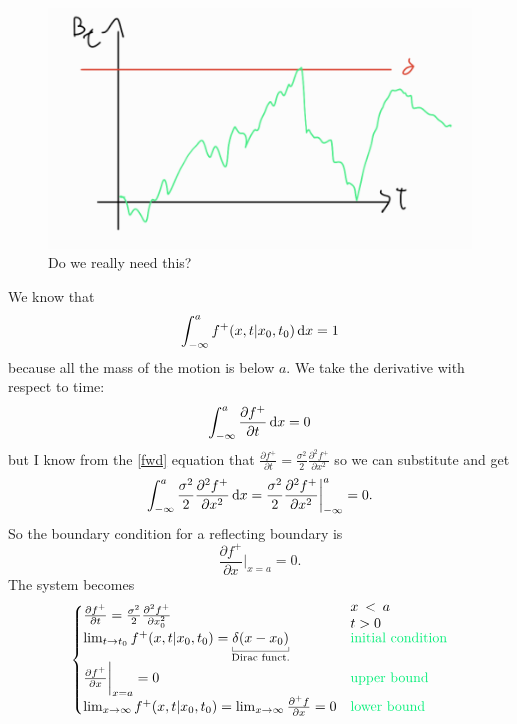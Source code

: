 \documentclass[12pt]{report}
\begin{document}
\begin{enumerate}
	\begin{figure}[H]
		\centering
		\includegraphics[width=0.5\linewidth]{img/screenshot052}
		\caption{Do we really need this?}
		\label{fig:screenshot052}
	\end{figure}
	We know that
	\begin{equation*}
		\int_{-\infty}^{a}f^{+}(x,t|x_{0},t_{0})\mathop{}\!\mathrm{d} x=1
	\end{equation*}
	because all the mass of the motion is below $a$. We take the derivative with respect to time:
	\begin{equation*}
		\int_{-\infty}^{a}\frac{\partial f^{+}}{\partial t}\mathop{}\!\mathrm{d} x=0
	\end{equation*}
	but I know from the \ref{fwd} equation that $\frac{\partial f^{+}}{\partial t}=\frac{\sigma^{2}}{2}\frac{\partial^{2}f^{+}}{\partial x^{2}}$ so we can substitute and get
	\begin{equation*}
		\int_{-\infty}^{a}\frac{\sigma^{2}}{2}\frac{\partial^{2}f^{+}}{\partial x^{2}}\mathop{}\!\mathrm{d} x=\frac{\sigma^{2}}{2}\frac{\partial^{2}f^{+}}{\partial x^{2}}\bigg|_{-\infty}^{a}=0.
	\end{equation*}
	So the boundary condition for a reflecting boundary is
	\begin{equation*}
		\frac{\partial f^{+}}{\partial x}\bigg|_{x=a}=0.
	\end{equation*}
	The system becomes
		\begin{equation*}\begin{cases}
			\frac{\partial f^+}{\partial t}=\frac{\sigma^{2}}{2}\frac{\partial^{2}f^+}{\partial x_{0}^{2}}&\parbox{1cm}{$x<a$ $t>0$}\\
			\lim_{t\to t_0}f^{+}(x,t|x_{0},t_{0})=\ubracketthin{\delta(x-x_{0})}_{\claptext{Dirac funct.}}&\text{\textcolor{SpringGreen2}{initial condition}}\\
				\frac{\partial f^{+}}{\partial x}\bigg|_{x=a}=0&\text{\textcolor{SpringGreen2}{upper bound}}\\
			\lim_{x\to\infty}f^{+}(x,t|x_{0},t_{0})=\lim_{x\to\infty}\frac{\partial^{+} f}{\partial x}=0&\text{\textcolor{SpringGreen2}{lower bound}}
		\end{cases}

\end{equation*}
\end{enumerate}
\end{document}
